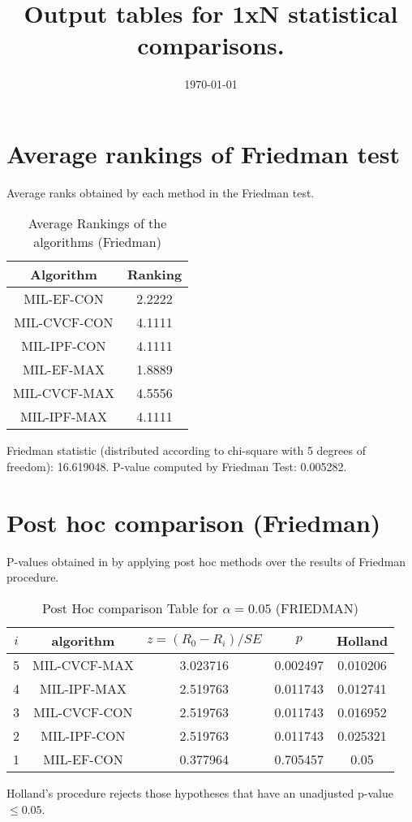 \documentclass[a4paper,10pt]{article}
\title{Output tables for 1xN statistical comparisons.}
\author{}
\date{\today}
\begin{document}
\begin{landscape}
\pagestyle{empty}
\maketitle
\thispagestyle{empty}

\section{Average rankings of Friedman test}


Average ranks obtained by each method in the Friedman test.

\begin{table}[!htp]
\centering
\begin{tabular}{|c|c|}\hline
Algorithm&Ranking\\\hline
MIL-EF-CON&2.2222\\MIL-CVCF-CON&4.1111\\MIL-IPF-CON&4.1111\\MIL-EF-MAX&1.8889\\MIL-CVCF-MAX&4.5556\\MIL-IPF-MAX&4.1111\\\hline\end{tabular}
\caption{Average Rankings of the algorithms (Friedman)}
\end{table}

Friedman statistic (distributed according to chi-square with 5 degrees of freedom): 16.619048. \newline P-value computed by Friedman Test: 0.005282.\newline


\newpage

\section{Post hoc comparison (Friedman)}


P-values obtained in by applying post hoc methods over the results of Friedman procedure.

\begin{table}[!htp]
\centering\footnotesize
\begin{tabular}{ccccc}
$i$&algorithm&$z=(R_0 - R_i)/SE$&$p$&Holland\\
\hline5&MIL-CVCF-MAX&3.023716&0.002497&0.010206\\4&MIL-IPF-MAX&2.519763&0.011743&0.012741\\3&MIL-CVCF-CON&2.519763&0.011743&0.016952\\2&MIL-IPF-CON&2.519763&0.011743&0.025321\\1&MIL-EF-CON&0.377964&0.705457&0.05\\\hline
\end{tabular}
\caption{Post Hoc comparison Table for $\alpha=0.05$ (FRIEDMAN)}
\end{table}Holland's procedure rejects those hypotheses that have an unadjusted p-value $\le0.05$.



\end{landscape}
\end{document}
